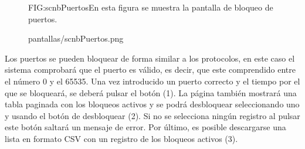 \begin{figure}[Pantalla de bloqueo de puertos]{FIG:scnbPuertos}{En esta figura se muestra la pantalla de bloqueo de puertos.}
  \begin{image}{}{}{pantallas/scnbPuertos.png}
  \end{image}
\end{figure}

Los puertos se pueden bloquear de forma similar a los protocolos, en este caso el sistema comprobará que el puerto es válido, es decir, que este comprendido entre el número 0 y el 65535. Una vez introducido un puerto correcto y el tiempo por el que se bloqueará, se deberá pulsar el botón (1). La página también mostrará una tabla paginada con los bloqueos activos y se podrá desbloquear seleccionando uno y usando el botón de desbloquear (2). Si no se selecciona ningún registro al pulsar este botón saltará un mensaje de error. Por último, es posible descargarse una lista en formato CSV con un registro de los bloqueos activos (3).